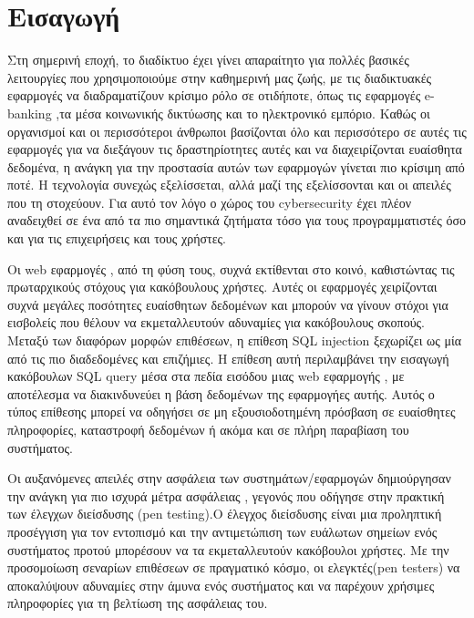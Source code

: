 \section{Εισαγωγή}

\hspace*{2em}\gt Στη σημερινή  εποχή, το διαδίκτυο έχει γίνει απαραίτητο για πολλές βασικές λειτουργίες που χρησιμοποιούμε στην καθημερινή μας ζωής, με τις διαδικτυακές εφαρμογές να διαδραματίζουν κρίσιμο ρόλο σε οτιδήποτε, όπως τις εφαρμογές \lt e-banking \gt ,τα μέσα κοινωνικής δικτύωσης και το ηλεκτρονικό εμπόριο. Καθώς οι οργανισμοί και οι περισσότεροι άνθρωποι βασίζονται όλο και περισσότερο σε αυτές τις εφαρμογές για να διεξάγουν τις δραστηρίοτητες αυτές και να διαχειρίζονται ευαίσθητα δεδομένα, η ανάγκη για την προστασία αυτών των εφαρμογών γίνεται πιο κρίσιμη από ποτέ. Η τεχνολογία συνεχώς εξελίσσεται, αλλά μαζί της εξελίσσονται και οι απειλές που τη στοχεύουν. Για αυτό τον λόγο ο χώρος του \lt cybersecurity \gt έχει πλέον αναδειχθεί σε ένα από τα πιο σημαντικά ζητήματα τόσο για τους προγραμματιστές όσο και για τις επιχειρήσεις και τους χρήστες.


Οι \lt web \gt εφαρμογές , από τη φύση τους, συχνά εκτίθενται στο κοινό, καθιστώντας τις πρωταρχικούς στόχους για κακόβουλους χρήστες. Αυτές οι εφαρμογές χειρίζονται συχνά μεγάλες ποσότητες ευαίσθητων δεδομένων και μπορούν να γίνουν στόχοι για εισβολείς που θέλουν να εκμεταλλευτούν αδυναμίες για κακόβουλους σκοπούς. Μεταξύ των διαφόρων μορφών επιθέσεων, η επίθεση \lt SQL injection \gt ξεχωρίζει ως μία από τις πιο διαδεδομένες και επιζήμιες. Η επίθεση αυτή περιλαμβάνει την εισαγωγή κακόβουλων \lt SQL query \gt μέσα στα πεδία εισόδου μιας \lt web \gt εφαρμογής , με αποτέλεσμα να διακινδυνεύει η βάση δεδομένων της εφαρμογήες αυτής. Αυτός ο τύπος επίθεσης μπορεί να οδηγήσει σε μη εξουσιοδοτημένη πρόσβαση σε ευαίσθητες πληροφορίες, καταστροφή δεδομένων ή ακόμα και σε πλήρη παραβίαση του συστήματος.

Οι αυξανόμενες απειλές στην ασφάλεια των συστημάτων/εφαρμογών δημιούργησαν την ανάγκη για πιο ισχυρά μέτρα ασφάλειας , γεγονός που οδήγησε στην πρακτική των έλεγχων διείσδυσης \lt(pen testing).\gt O έλεγχος διείσδυσης είναι μια προληπτική προσέγγιση για τον εντοπισμό και την αντιμετώπιση των ευάλωτων σημείων ενός συστήματος προτού μπορέσουν να τα εκμεταλλευτούν κακόβουλοι χρήστες. Με την προσομοίωση σεναρίων επιθέσεων σε πραγματικό κόσμο, οι ελεγκτές(\lt pen testers)  να αποκαλύψουν αδυναμίες στην άμυνα ενός συστήματος και να παρέχουν χρήσιμες πληροφορίες για τη βελτίωση της ασφάλειας του.

